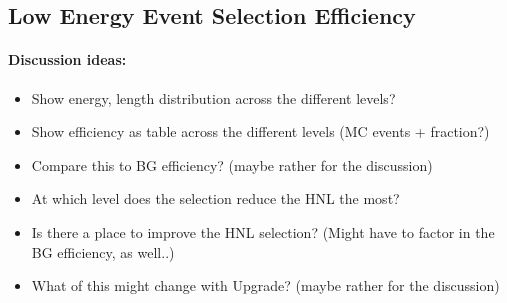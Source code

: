 \subsection{Low Energy Event Selection Efficiency}


\paragraph{Discussion ideas:}
\begin{itemize}
    \item Show energy, length distribution across the different levels?
    \item Show efficiency as table across the different levels (MC events + fraction?)
    \item Compare this to BG efficiency? (maybe rather for the discussion)
    \item At which level does the selection reduce the HNL the most?
    \item Is there a place to improve the HNL selection? (Might have to factor in the BG efficiency, as well..)
    \item What of this might change with Upgrade? (maybe rather for the discussion)
\end{itemize}
